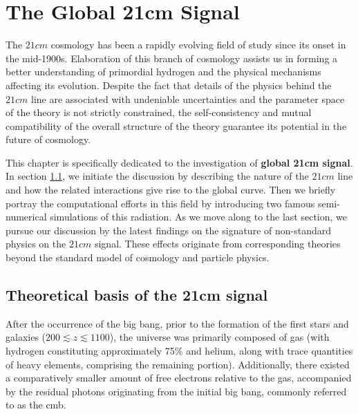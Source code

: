 \documentclass[12pt, TexShade, letterpaper]{report}
\begin{document}
\chapter{The Global 21cm Signal}
\label{chap:global21cm}
The $21cm$ cosmology has been a rapidly evolving field of study since its onset in the mid-1900s. Elaboration of this branch of cosmology assists us in forming a better understanding of primordial hydrogen and the physical mechanisms affecting its evolution. Despite the fact that details of the physics behind the $21cm$ line are associated with undeniable uncertainties and the parameter space of the theory is not strictly constrained, the self-consistency and mutual compatibility of the overall structure of the theory guarantee its potential in the future of cosmology. \par
This chapter is specifically dedicated to the investigation of  \textbf{global 21cm signal}. In section \ref{chap:global21cm,sub:physics}, we initiate the discussion by describing the nature of the $21cm$ line and how the related interactions give rise to the global curve. Then we briefly portray the computational efforts in this field by introducing two famous semi-numerical simulations of this radiation.
As we move along to the last section, we pursue our discussion by the latest findings on the signature of non-standard physics on the $21cm$ signal. These effects originate from corresponding theories beyond the standard model of cosmology and particle physics.\par
\section{Theoretical basis of the 21cm signal}
\label{chap:global21cm,sub:physics}
After the occurrence of the big bang, prior to the formation of the first stars and galaxies ($200 \lesssim z \lesssim 1100$), the universe was primarily composed of gas (with hydrogen constituting approximately 75\% and helium, along with trace quantities of heavy elements, comprising the remaining portion). Additionally, there existed a comparatively smaller amount of free electrons relative to the gas, accompanied by the residual photons originating from the initial big bang, commonly referred to as the \gls{cmb}\cite{map_universe, 21century}.
\end{document}

